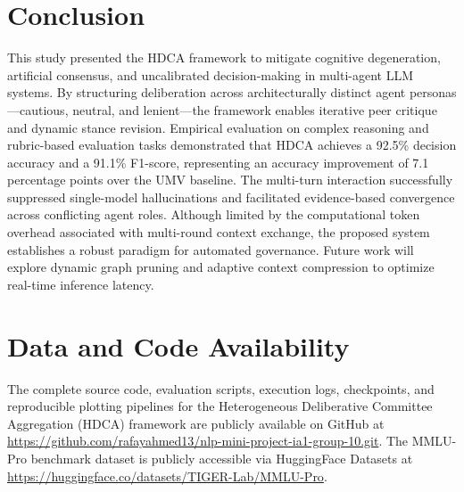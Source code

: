 \documentclass[a4paper,fleqn]{cas-sc}
\begin{document}
\section{Conclusion}
This study presented the HDCA framework to mitigate cognitive degeneration, artificial consensus, and uncalibrated decision-making in multi-agent LLM systems. By structuring deliberation across architecturally distinct agent personas---cautious, neutral, and lenient---the framework enables iterative peer critique and dynamic stance revision. Empirical evaluation on complex reasoning and rubric-based evaluation tasks demonstrated that HDCA achieves a 92.5\% decision accuracy and a 91.1\% F1-score, representing an accuracy improvement of 7.1 percentage points over the UMV baseline. The multi-turn interaction successfully suppressed single-model hallucinations and facilitated evidence-based convergence across conflicting agent roles. Although limited by the computational token overhead associated with multi-round context exchange, the proposed system establishes a robust paradigm for automated governance. Future work will explore dynamic graph pruning and adaptive context compression to optimize real-time inference latency.

\section*{Data and Code Availability}
The complete source code, evaluation scripts, execution logs, checkpoints, and reproducible plotting pipelines for the Heterogeneous Deliberative Committee Aggregation (HDCA) framework are publicly available on GitHub at \url{https://github.com/rafayahmed13/nlp-mini-project-ia1-group-10.git}. The MMLU-Pro benchmark dataset is publicly accessible via HuggingFace Datasets at \url{https://huggingface.co/datasets/TIGER-Lab/MMLU-Pro}.





\clearpage

\appendix
\end{document}
